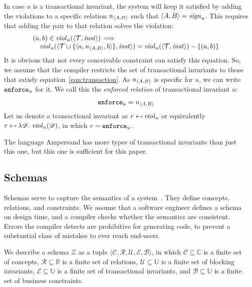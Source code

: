 \documentclass[runningheads]{llncs}
\newcommand{\id}[1]{\text{\it #1\/}}
\newcommand{\enforceC}[1]{{\tt enforce}_{#1}}
\newcommand{\instance}{\mathbin{\id{inst}}}
\newcommand{\viol}[2]{\violC{#1}(#2)}
\newcommand{\violC}[1]{\id{viol}_{#1}}
\newcommand{\sign}[1]{\id{sign}_{#1}}
\newcommand{\enfRel}[1]{\enforceC{#1}}
\newcommand{\declare}[3]{\id{#1}_{\pair{#2}{#3}}}
\newcommand{\pair}[2]{\langle{#1},{#2}\rangle}
\newcommand{\triple}[3]{\langle{#1},{#2},{#3}\rangle}
\newcommand{\quintuple}[5]{\langle{#1},{#2},{#3},{#4},{#5}\rangle}
\newcommand{\concepts}{\mathcal{C}}
\newcommand{\Concepts}{\mathbb{C}}
\newcommand{\rels}{\mathcal{R}}   %
\newcommand{\Rels}{\mathbb{R}}   %
\newcommand{\triples}{\mathcal{T}}
\newcommand{\rules}{\mathcal{U}}
\newcommand{\transactions}{\mathcal{E}}
\newcommand{\busConstraints}{\mathcal{B}}
\newcommand{\Constraints}{\mathbb{U}}
\newcommand{\dataset}{\mathscr{D}}
\newcommand{\schema}{\mathscr{Z}}
\def\define#1{\label{dfn:#1}{\em #1}\index{#1}}
\begin{document}
   In case $u$ is a transactional invariant,
   the system will keep it satisfied by adding the violations to a specific relation $\declare{n}{A}{B}$ such that $\pair{A}{B}=\sign{u}$.
   This requires that adding the pair to that relation solves the violation:
\begin{equation}
   \begin{array}[t]{l}
      (a,b)\in \viol{u}{\pair{\triples}{\instance}}\, \Longrightarrow \\
      \quad \viol{u}{\pair{\triples \cup \{\triple{a}{\declare{n}{A}{B}}{b}\}}{\instance}} = \viol{u}{\pair{\triples}{\instance}} - \{(a,b)\}
   \end{array}
\label{eqn:transaction}
\end{equation}
   It is obvious that not every conceivable constraint can satisfy this equation.
   So, we assume that the compiler restricts the set of transactional invariants to those that satisfy equation~\ref{eqn:transaction}.
   As $\declare{n}{A}{B}$ is specific for $u$, we can write $\enfRel{u}$ for it.
   We call this the \define{enforced relation} of transactional invariant $u$:
\begin{equation}
   \enfRel{u}=\declare{n}{A}{B}
\end{equation}
   Let us denote a transactional invariant as $r\mapsfrom\violC{u}$ or equivalently $r \mapsfrom \lambda \dataset.~\viol{u}{\dataset}$,
   in which $r=\enfRel{u}$.
   
   The language Ampersand has more types of transactional invariants than just this one,
   but this one is sufficient for this paper.

\subsection{Schemas}
\label{sct:Schemas}
   Schemas serve to capture the semantics of a system~\cite{Spivak2012}.
   They define concepts, relations, and constraints.
   We assume that a software engineer defines a schema on design time, and a compiler checks whether the semantics are consistent.
   Errors the compiler detects are prohibitive for generating code,
   to prevent a substantial class of mistakes to ever reach end-users.

   We describe a schema $\schema$ as a tuple $\quintuple{\concepts}{\rels}{\rules}{\transactions}{\busConstraints}$,
   in which $\concepts\subseteq\Concepts$ is a finite set of concepts,
   $\rels\subseteq\Rels$ is a finite set of relations,
   $\rules\subseteq\Constraints$ is a finite set of blocking invariants,
   $\transactions\subseteq\Constraints$ is a finite set of transactional invariants,
   and $\busConstraints\subseteq\Constraints$ is a finite set of business constraints.
\end{document}
